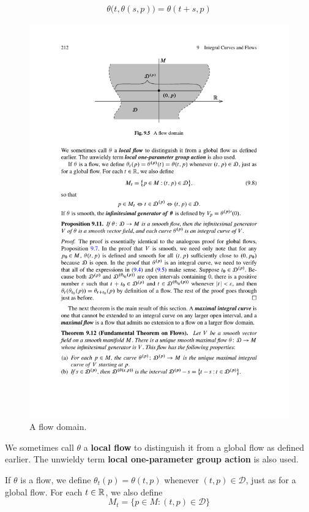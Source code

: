 \begin{align}\label{group law-2}
\theta\big(t,\theta(s,p)\big)=\theta(t+s,p)
\end{align}
\begin{figure}[htbp]
\centering
\includegraphics{pictures/flow-domain}
\caption{A flow domain.}
\end{figure}\par
We sometimes call $\theta$ a \textbf{local flow} to distinguish it from a global flow as defined earlier. The unwieldy term \textbf{local one-parameter group action} is also used.\par
If $\theta$ is a flow, we define $\theta_t(p)=\theta(t,p)$ whenever $(t,p)\in\mathcal{D}$, just as for a global flow. For each $t\in\mathbb{R}$, we also define
\[M_t=\{p\in M:(t,p)\in\mathcal{D}\}\]
